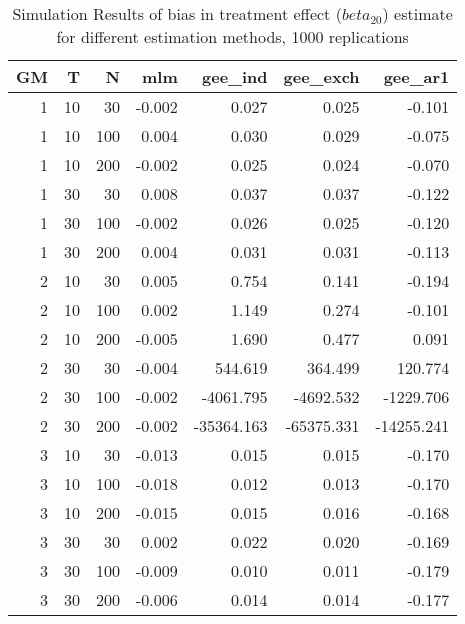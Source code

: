 \begin{table}[ht]
\centering
\begin{tabular}{rrrrrrr}
  \hline
GM & T & N & mlm & gee\_ind & gee\_exch & gee\_ar1 \\ 
  \hline
1 & 10 & 30 & -0.002 & 0.027 & 0.025 & -0.101 \\ 
  1 & 10 & 100 & 0.004 & 0.030 & 0.029 & -0.075 \\ 
  1 & 10 & 200 & -0.002 & 0.025 & 0.024 & -0.070 \\ 
  1 & 30 & 30 & 0.008 & 0.037 & 0.037 & -0.122 \\ 
  1 & 30 & 100 & -0.002 & 0.026 & 0.025 & -0.120 \\ 
  1 & 30 & 200 & 0.004 & 0.031 & 0.031 & -0.113 \\ 
   \hline
2 & 10 & 30 & 0.005 & 0.754 & 0.141 & -0.194 \\ 
  2 & 10 & 100 & 0.002 & 1.149 & 0.274 & -0.101 \\ 
  2 & 10 & 200 & -0.005 & 1.690 & 0.477 & 0.091 \\ 
  2 & 30 & 30 & -0.004 & 544.619 & 364.499 & 120.774 \\ 
  2 & 30 & 100 & -0.002 & -4061.795 & -4692.532 & -1229.706 \\ 
  2 & 30 & 200 & -0.002 & -35364.163 & -65375.331 & -14255.241 \\ 
   \hline
3 & 10 & 30 & -0.013 & 0.015 & 0.015 & -0.170 \\ 
  3 & 10 & 100 & -0.018 & 0.012 & 0.013 & -0.170 \\ 
  3 & 10 & 200 & -0.015 & 0.015 & 0.016 & -0.168 \\ 
  3 & 30 & 30 & 0.002 & 0.022 & 0.020 & -0.169 \\ 
  3 & 30 & 100 & -0.009 & 0.010 & 0.011 & -0.179 \\ 
  3 & 30 & 200 & -0.006 & 0.014 & 0.014 & -0.177 \\ 
   \hline
\end{tabular}
\caption{Simulation Results of bias in treatment effect ($beta_{20}$) estimate for different estimation methods, 1000 replications} 
\label{tab:sim_results_bias}
\end{table}
